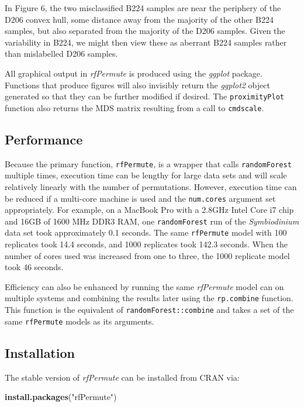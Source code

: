 \documentclass[]{article}
\newenvironment{Shaded}{\begin{snugshade}}{\end{snugshade}}
\newcommand{\KeywordTok}[1]{\textcolor[rgb]{0.13,0.29,0.53}{\textbf{{#1}}}}
\newcommand{\StringTok}[1]{\textcolor[rgb]{0.31,0.60,0.02}{{#1}}}
\newcommand{\NormalTok}[1]{{#1}}
\begin{document}
In Figure 6, the two misclassified B224 samples are near the periphery
of the D206 convex hull, some distance away from the majority of the
other B224 samples, but also separated from the majority of the D206
samples. Given the variability in B224, we might then view these as
aberrant B224 samples rather than mislabelled D206 samples.

All graphical output in \emph{rfPermute} is produced using the
\emph{ggplot} package. Functions that produce figures will also
invisibly return the \emph{ggplot2} object generated so that they can be
further modified if desired. The \texttt{proximityPlot} function also
returns the MDS matrix resulting from a call to \texttt{cmdscale}.

\subsection{Performance}\label{performance}

Because the primary function, \texttt{rfPermute}, is a wrapper that
calls \texttt{randomForest} multiple times, execution time can be
lengthy for large data sets and will scale relatively linearly with the
number of permutations. However, execution time can be reduced if a
multi-core machine is used and the \texttt{num.cores} argument set
appropriately. For example, on a MacBook Pro with a 2.8GHz Intel Core i7
chip and 16GB of 1600 MHz DDR3 RAM, one \texttt{randomForest} run of the
\emph{Symbiodinium} data set took approximately 0.1 seconds. The same
\texttt{rfPermute} model with 100 replicates took 14.4 seconds, and 1000
replicates took 142.3 seconds. When the number of cores used was
increased from one to three, the 1000 replicate model took 46 seconds.

Efficiency can also be enhanced by running the same \emph{rfPermute}
model can on multiple systems and combining the results later using the
\texttt{rp.combine} function. This function is the equivalent of
\texttt{randomForest::combine} and takes a set of the same
\texttt{rfPermute} models as its arguments.

\subsection{Installation}\label{installation}

The stable version of \emph{rfPermute} can be installed from CRAN via:

\begin{Shaded}
\begin{Highlighting}[]
\KeywordTok{install.packages}\NormalTok{(}\StringTok{"rfPermute"}\NormalTok{)}
\end{Highlighting}
\end{Shaded}
\end{document}
